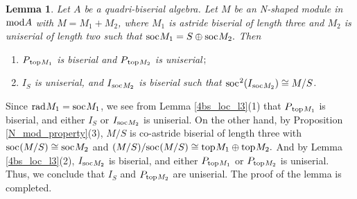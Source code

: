 \documentclass[10pt]{amsart}
\newtheorem{Lemma}[Theo]{Lemma}
\theoremstyle{definition}
\newcommand{\mmod}{{\rm mod}}
\newcommand{\rad}{{\rm rad}\hspace{.5pt}}
\newcommand{\soc}{{\rm soc}\hspace{.5pt}}
\newcommand{\ntop}{{\rm top}\hspace{.5pt}}
\begin{document}
\begin{Lemma}\label{N_mod_property-2}
Let $A$ be a quadri-biserial algebra. Let $M$ be an N-shaped module in $\mmod A$ with $M=M_1+M_2$, where $M_1$ is astride biserial of length three and $M_2$ is uniserial of length two such that $\soc M_1=S\oplus \soc M_2.$ Then

\begin{enumerate}[$(1)$]

\vspace{-2pt}

\item $P_{\hspace{1pt}\ntop M_1}$ is biserial and $P_{\hspace{1pt}\ntop M_2}$ is uniserial$\hspace{.8pt};$

\vspace{.5pt}

\item $I_S$ is uniserial, and $I_{\hspace{.5pt}\soc M_2}$ is biserial 
such that $\soc^2(I_{\hspace{.5pt}\soc M_2}) \cong M/S$.
 
 \end{enumerate}\end{Lemma}

\vspace{-1.5pt}

 Since $\rad M_1=\soc M_1$, we see from Lemma \ref{4bs_loc_l3}(1) that $P_{\hspace{1pt}\ntop M_1}$ is biserial, 
and either $I_S$ or $I_{\soc M_2}$ is uniserial. On the other hand, by Proposition \ref{N_mod_property}(3), $M/S$ is co-astride biserial of length three with $\soc(M/S)  \cong  \soc M_2$ and $(M/S)/\soc(M/S)  \cong \ntop M_1\oplus \ntop M_2.$ And by Lemma \ref{4bs_loc_l3}(2), $I_{\soc M_2}$ is biserial, and either $P_{\ntop M_1}$ or $P_{\ntop M_2}$ is uniserial. Thus, we conclude that $I_S$ and $P_{\ntop M_2}$ are uniserial. The proof of the lemma is completed.
\end{document}
